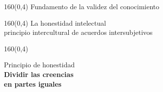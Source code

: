 \documentclass[shownotes,aspectratio=169]{beamer}
\newif\ifen
\newif\ifes
\newcommand{\en}[1]{\ifen#1\fi}
\newcommand{\es}[1]{\ifes#1\fi}
\begin{document}
\begin{frame}[plain]
\begin{textblock}{160}(0,4)
\centering \LARGE Fundamento de la validez del conocimiento \\ 
\end{textblock}
\vspace{0.75cm}

 
\end{frame}


\begin{frame}[plain]
\begin{textblock}{160}(0,4)
\centering \LARGE La honestidad intelectual \\ \Large principio intercultural de acuerdos intersubjetivos
\end{textblock}
\vspace{0.75cm}


\end{frame}
 

\begin{frame}[plain]
\begin{textblock}{160}(0,4)
 \centering \LARGE 
 \en{Hidden variables and \textbf{honest} beliefs}
 \es{Hipótesis y creencias \textbf{honestas}}
 \end{textblock}
\vspace{1cm}

 \begin{center}
 Principio de honestidad \\
   \LARGE
\textbf{Dividir las creencias \\ en partes iguales}
 \end{center}
\end{frame}
\end{document}
